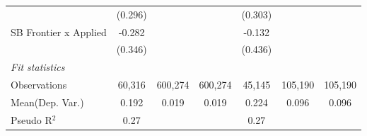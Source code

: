 \begin{tabular}{lcccccc}
                         & (0.296)       &         &         & (0.303)       &         &   \\   
   SB Frontier x Applied & -0.282        &         &         & -0.132        &         &   \\   
                         & (0.346)       &         &         & (0.436)       &         &   \\   
   \midrule
   \emph{Fit statistics}\\
   Observations          & 60,316        & 600,274 & 600,274 & 45,145        & 105,190 & 105,190\\  
Mean(Dep. Var.) & 0.192 & 0.019 & 0.019 & 0.224 & 0.096 & 0.096 \\
   Pseudo R$^2$          & 0.27          &         &         & 0.27          &         & \\  
   

\end{tabular}
